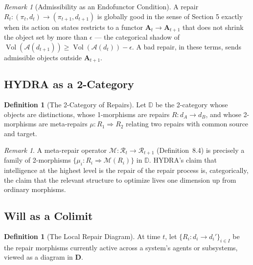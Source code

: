 \documentclass[11pt]{article}
\theoremstyle{plain}
\theoremstyle{definition}
\newtheorem{definition}[theorem]{Definition}
\theoremstyle{remark}
\newtheorem{remark}[theorem]{Remark}
\begin{document}
\begin{remark}[Admissibility as an Endofunctor Condition]
A repair $R_t : (\pi_t,d_t) \to (\pi_{t+1},d_{t+1})$ is globally good in the sense of Section 5 exactly when its action on states restricts to a functor $\mathbf{A}_t \to \mathbf{A}_{t+1}$ that does not shrink the object set by more than $\epsilon$ --- the categorical shadow of $\operatorname{Vol}(\mathcal{A}(d_{t+1})) \ge \operatorname{Vol}(\mathcal{A}(d_t)) - \epsilon$. A bad repair, in these terms, sends admissible objects outside $\mathbf{A}_{t+1}$.
\end{remark}

\subsection{HYDRA as a 2-Category}

\begin{definition}[The 2-Category of Repairs]
Let $\mathbb{D}$ be the 2-category whose objects are distinctions, whose 1-morphisms are repairs $R : d_A \to d_B$, and whose 2-morphisms are meta-repairs $\mu : R_1 \Rightarrow R_2$ relating two repairs with common source and target.
\end{definition}

\begin{remark}
A meta-repair operator $\mathcal{M} : \mathcal{R}_t \to \mathcal{R}_{t+1}$ (Definition~8.4) is precisely a family of 2-morphisms $\{\mu_i : R_i \Rightarrow \mathcal{M}(R_i)\}$ in $\mathbb{D}$. HYDRA's claim that intelligence at the highest level is the repair of the repair process is, categorically, the claim that the relevant structure to optimize lives one dimension up from ordinary morphisms.
\end{remark}

\subsection{Will as a Colimit}

\begin{definition}[The Local Repair Diagram]
At time $t$, let $\{R_i : d_i \to d_i'\}_{i \in I}$ be the repair morphisms currently active across a system's agents or subsystems, viewed as a diagram in $\mathbf{D}$.
\end{definition}
\end{document}
